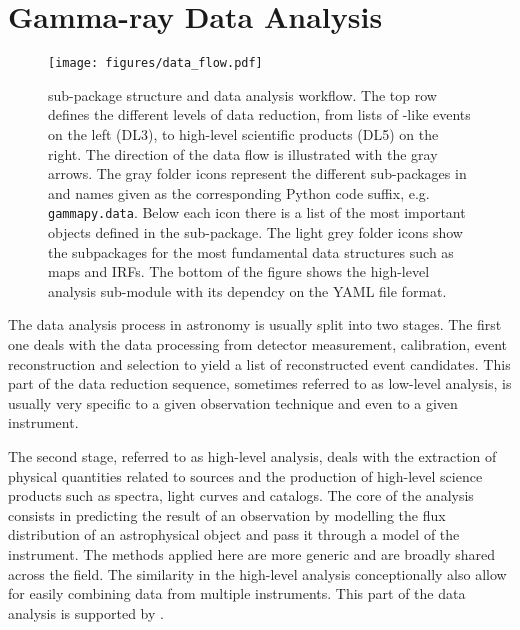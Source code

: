 \documentclass[longauth]{aa}
\newcommand{\code}[1]{\texttt{#1}}
\begin{document}
\section{Gamma-ray Data Analysis}
\begin{figure*}[t]
	\centering
	\texttt{[image: figures/data\_flow.pdf]}
	\caption{
		\gammapy sub-package structure and data analysis workflow. The top row
        defines the different levels of data reduction, from lists of \gammaray-like
        events on the left (DL3), to high-level scientific products
        (DL5) on the right. The direction of the data flow is illustrated with the
        gray arrows. The gray folder icons represent the different sub-packages
        in \gammapy and names given as the corresponding Python code suffix, e.g. 
		\code{gammapy.data}. Below each icon there is a list of the most
        important objects defined in the sub-package. The light grey folder
		icons show the subpackages for the most fundamental data structures such 
		as maps and IRFs. The bottom of the figure shows the high-level analysis
		sub-module with its dependcy on the YAML file format. 
    }
	\label{fig:data_flow}
\end{figure*}
%
\label{sec:gammaray-data-analysis}
The data analysis process in \gammaray astronomy is usually split into two stages.
The first one deals with the data processing from detector measurement, calibration, event
reconstruction and selection to yield a list of reconstructed \gammaray event candidates.
This part of the data reduction sequence, sometimes referred to as low-level analysis,
is usually very specific to a given observation technique and even to a given instrument.

The second stage, referred to as high-level analysis, deals with the extraction of physical
quantities related to \gammaray sources and the production of high-level science products
such as spectra, light curves and catalogs. The core of the analysis consists in predicting
the result of an observation by modelling the flux distribution of an astrophysical
object and pass it through a model of the instrument. The methods applied here are more
generic and are broadly shared across the field. The similarity in the high-level
analysis conceptionally also allow for easily combining data from multiple instruments.
This part of the data analysis is supported by \gammapy. 
\end{document}
